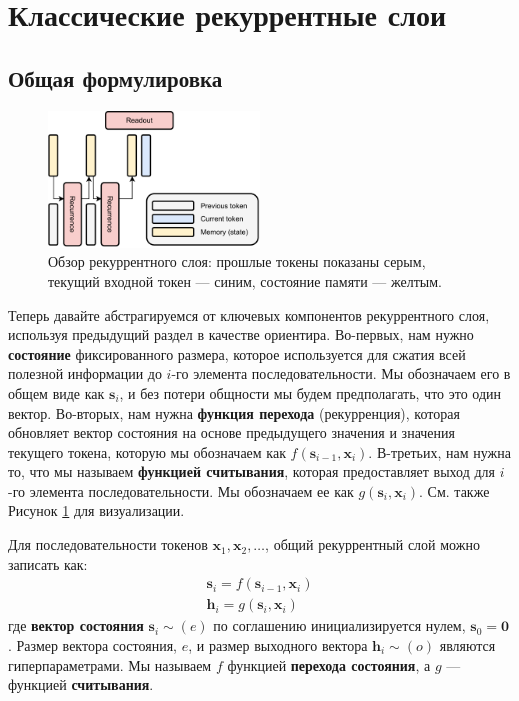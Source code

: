 \section{Классические рекуррентные слои}
\subsection{Общая формулировка}

\begin{figure}
    \centering
    \hspace{2em}\includegraphics[width=0.5\textwidth]{images/recurrence}
    \caption{Обзор рекуррентного слоя: прошлые токены показаны серым, текущий входной токен — синим, состояние памяти — желтым.}
    \label{fig:recurrence}
\end{figure}

Теперь давайте абстрагируемся от ключевых компонентов рекуррентного слоя, используя предыдущий раздел в качестве ориентира. Во-первых, нам нужно \textbf{состояние} фиксированного размера, которое используется для сжатия всей полезной информации до $i$-го элемента последовательности. Мы обозначаем его в общем виде как $\mathbf{s}_i$, и без потери общности мы будем предполагать, что это один вектор. Во-вторых, нам нужна \textbf{функция перехода} (рекурренция), которая обновляет вектор состояния на основе предыдущего значения и значения текущего токена, которую мы обозначаем как $f(\mathbf{s}_{i-1}, \mathbf{x}_i)$. В-третьих, нам нужна то, что мы называем \textbf{функцией считывания}, которая предоставляет выход для $i$-го элемента последовательности. Мы обозначаем ее как $g(\mathbf{s}_i, \mathbf{x}_i)$. См. также Рисунок \ref{fig:recurrence} для визуализации. 

\begin{definition} \addbottle
%
Для последовательности токенов $\mathbf{x}_1, \mathbf{x}_2, \ldots$, общий рекуррентный слой можно записать как: 
%
\begin{gather}
\mathbf{s}_i = f(\mathbf{s}_{i-1},\mathbf{x}_i) \label{eq:recurrent_layer_state_update} \\
\mathbf{h}_i = g(\mathbf{s}_i, \mathbf{x}_i) \label{eq:recurrent_layer_readout}
\end{gather}
%
где \textbf{вектор состояния} $\mathbf{s}_i \sim (e)$ по соглашению инициализируется нулем, $\mathbf{s}_0 = \mathbf{0}$. Размер вектора состояния, $e$, и размер выходного вектора $\mathbf{h}_i \sim (o)$ являются гиперпараметрами. Мы называем $f$ функцией \textbf{перехода состояния}, а $g$ — функцией \textbf{считывания}.
%
\end{definition}

